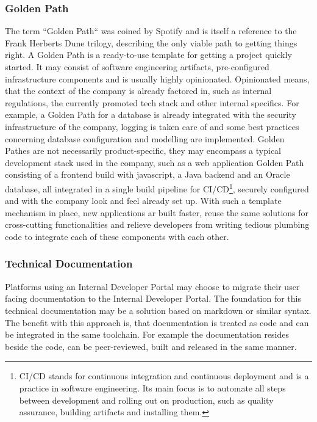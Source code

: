 \documentclass[a4paper,12pt]{article}
\begin{document}
    \subsubsection{Golden Path}
    The term ``Golden Path`` was coined by Spotify\parencite{spotifygoldenpath} and is itself a reference to the Frank
    Herberts Dune trilogy, describing the only viable path to getting things right.
    A Golden Path is a ready-to-use template for getting a project quickly started.
    It may consist of software engineering artifacts, pre-configured infrastructure components and is usually highly
    opinionated.
    Opinionated means, that the context of the company is already factored in, such as internal regulations,
    the currently promoted tech stack and other internal specifics.
    For example, a Golden Path for a database is already integrated with the security infrastructure of the company,
    logging is taken care of and some best practices concerning database configuration and modelling are implemented.
    Golden Pathes are not necessarily product-specific, they may encompass a typical development stack used
    in the company, such as a web application Golden Path consisting of a frontend build with javascript, a Java backend
    and an Oracle database, all integrated in a single build pipeline for CI/CD\footnote{CI/CD stands for continuous
    integration and continuous deployment and is a practice in software engineering. Its main focus is to automate all steps
    between development and rolling out on production, such as quality assurance, building artifacts and installing them.},
    securely configured and with the company look and feel already set up.
    With such a template mechanism in place, new applications ar built faster, reuse the same solutions for cross-cutting
    functionalities and relieve developers from writing tedious plumbing code to integrate each of these components with
    each other.

    \subsubsection{Technical Documentation}
    Platforms using an Internal Developer Portal may choose to migrate their user facing documentation to the Internal
    Developer Portal.
    The foundation for this technical documentation may be a solution based on markdown\parencite{backstagetechdocs}
    or similar syntax.
    The benefit with this approach is, that documentation is treated as code and can be integrated in the same toolchain.
    For example the documentation resides beside the code, can be peer-reviewed, built and released in the same manner.
\end{document}
